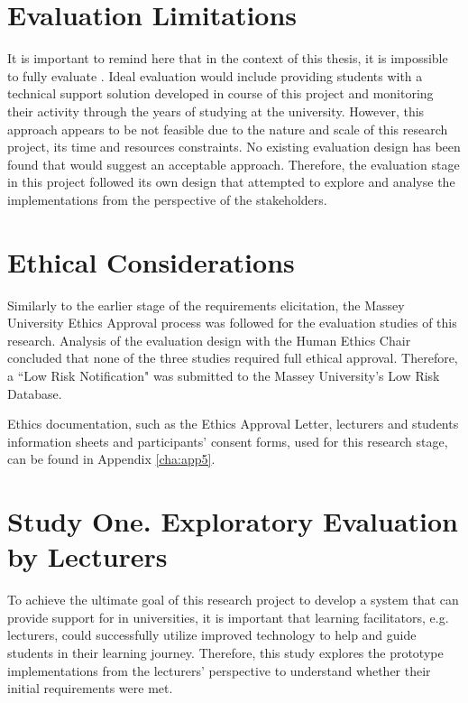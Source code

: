 \section{Evaluation Limitations}

It is important to remind here that in the context of this thesis, it is
impossible to fully evaluate \LLLsn. Ideal evaluation would include providing
students with a technical support solution developed in course of this project
and monitoring their activity through the years of studying at the university.
However, this approach appears to be not feasible due to the nature and scale of
this research project, its time and resources constraints. No existing
evaluation design has been found that would suggest an acceptable approach.
Therefore, the evaluation stage in this project followed its own design that
attempted to explore and analyse the implementations from the perspective of
the \LLLs stakeholders.

\section{Ethical Considerations}

Similarly to the earlier stage of the requirements elicitation, the Massey
University Ethics Approval process was followed for the evaluation studies of
this research. Analysis of the evaluation design with the Human Ethics Chair
concluded that none of the three studies required full ethical approval.
Therefore, a ``Low Risk Notification" was submitted to the Massey University's
Low Risk Database.

Ethics documentation, such as the Ethics Approval Letter, lecturers and students
information sheets and participants' consent forms, used for this research
stage, can be found in Appendix \ref{cha:app5}.

\section{Study One. Exploratory Evaluation by Lecturers}
\label{sec:one}

To achieve the ultimate goal of this research project to develop a system that
can provide support for \LLLs in universities, it is important that learning
facilitators, e.g. lecturers, could successfully utilize improved technology to
help and guide students in their learning journey. Therefore, this study
explores the prototype implementations from the lecturers' perspective to
understand whether their initial requirements were met.

